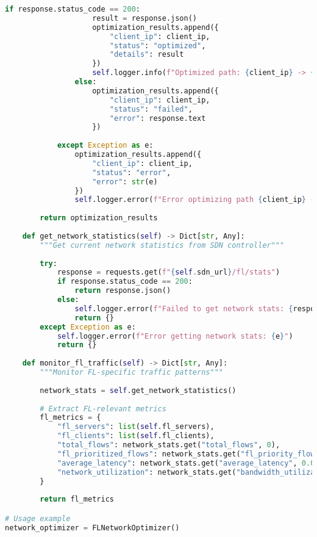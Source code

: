 \begin{lstlisting}[language=python, caption=SDN Controller Integration]
                if response.status_code == 200:
                    result = response.json()
                    optimization_results.append({
                        "client_ip": client_ip,
                        "status": "optimized",
                        "details": result
                    })
                    self.logger.info(f"Optimized path: {client_ip} -> {server_ip}")
                else:
                    optimization_results.append({
                        "client_ip": client_ip,
                        "status": "failed",
                        "error": response.text
                    })
            
            except Exception as e:
                optimization_results.append({
                    "client_ip": client_ip,
                    "status": "error",
                    "error": str(e)
                })
                self.logger.error(f"Error optimizing path {client_ip} -> {server_ip}: {e}")
        
        return optimization_results
    
    def get_network_statistics(self) -> Dict[str, Any]:
        """Get current network statistics from SDN controller"""
        
        try:
            response = requests.get(f"{self.sdn_url}/fl/stats")
            if response.status_code == 200:
                return response.json()
            else:
                self.logger.error(f"Failed to get network stats: {response.status_code}")
                return {}
        except Exception as e:
            self.logger.error(f"Error getting network stats: {e}")
            return {}
    
    def monitor_fl_traffic(self) -> Dict[str, Any]:
        """Monitor FL-specific traffic patterns"""
        
        network_stats = self.get_network_statistics()
        
        # Extract FL-relevant metrics
        fl_metrics = {
            "fl_servers": list(self.fl_servers),
            "fl_clients": list(self.fl_clients),
            "total_flows": network_stats.get("total_flows", 0),
            "fl_prioritized_flows": network_stats.get("fl_priority_flows", 0),
            "average_latency": network_stats.get("average_latency", 0.0),
            "network_utilization": network_stats.get("bandwidth_utilization", 0.0)
        }
        
        return fl_metrics

# Usage example
network_optimizer = FLNetworkOptimizer()


\end{lstlisting}
